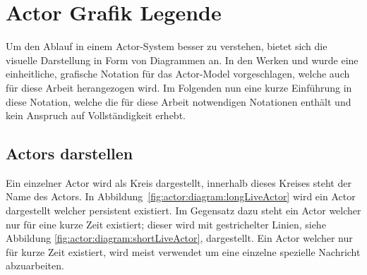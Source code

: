 \section{Actor Grafik Legende}\label{actor:diagram:description}
Um den Ablauf in einem Actor-System besser zu verstehen, bietet sich die visuelle Darstellung in Form von Diagrammen an. In den Werken \cite{kuhn2017reactive} und \cite{Vernon2015ReactiveAkka} wurde eine einheitliche, grafische Notation für das  Actor-Model vorgeschlagen, welche auch für diese Arbeit herangezogen wird. Im Folgenden nun eine kurze Einführung in diese Notation, welche die für diese Arbeit notwendigen Notationen enthält und kein Anspruch auf Vollständigkeit erhebt.\\
\subsection{Actors darstellen}
Ein einzelner Actor wird als Kreis dargestellt, innerhalb dieses Kreises steht der Name des Actors. In Abbildung~\ref{fig:actor:diagram:longLiveActor} wird ein Actor dargestellt welcher persistent existiert. Im Gegensatz dazu steht ein Actor welcher nur für eine kurze Zeit existiert; dieser wird mit gestrichelter Linien, siehe Abbildung \ref{fig:actor:diagram:shortLiveActor}, dargestellt. Ein Actor welcher nur für kurze Zeit existiert, wird meist verwendet um eine einzelne spezielle Nachricht abzuarbeiten. 
